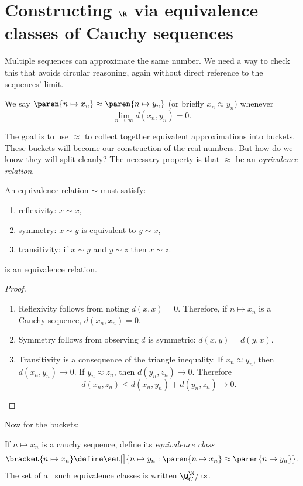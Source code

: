 \documentclass{scrartcl}
\newcommand{\dist}{d}
\begin{document}
\section{Constructing $\R$ via equivalence classes of Cauchy sequences}
Multiple sequences can approximate the same number. We need a way to check this that avoids circular reasoning, again without direct reference to the sequences' limit.
\begin{defn}[$\approx$]\label{cauchy-eq}
  We say $\paren{n\mapsto x_{n}}\approx\paren{n\mapsto  y_{n}}$ (or briefly $x_{n}\approx y_{n}$) whenever
  \[
    \lim_{{n\to\infty}} \dist(x_{n},y_{n}) = 0.
  \]
\end{defn}

The goal is to use $\approx$ to collect together equivalent approximations into buckets. These buckets will become our construction of the real numbers. But how do we know they will split cleanly? The necessary property is that $\approx$ be an \emph{equivalence relation}.
\begin{defn}
  An equivalence relation $\sim$ must satisfy:
  \begin{enumerate}
    \item reflexivity: $x\sim x$,
    \item symmetry: $x\sim y$ is equivalent to $y\sim x$,
    \item transitivity: if $x\sim y$ and $y \sim z$ then $x\sim z$.
  \end{enumerate}
\end{defn}
\begin{theorem}
   is an equivalence relation.
\end{theorem}
\begin{proof}
  \phantom{M}
  \begin{enumerate}
    \item Reflexivity follows from noting $\dist(x,x)=0$. Therefore, if $n \mapsto x_{n}$ is a Cauchy sequence, $\dist(x_{n},x_{n})=0$.

    \item Symmetry follows from observing $\dist$ is symmetric: $\dist(x,y)=\dist(y,x)$.
    \item Transitivity is a consequence of the triangle inequality.
          If $x_{n}\approx y_{n}$, then $\dist(x_{n},y_{n})\to 0$. If $y_{n}\approx z_{n}$, then $\dist(y_{n},z_{n})\to 0$. Therefore
          \[
          \dist(x_{n},z_{n}) \leq \dist(x_{n},y_{n}) + \dist(y_{n},z_{n}) \to 0.
          \]
  \end{enumerate}
\end{proof}
Now for the buckets:
\begin{defn}
  If $n\mapsto x_{n}$ is a cauchy sequence, define its \emph{equivalence class}
  \[
    \bracket{n\mapsto x_{n}} \define \set[\big]{n\mapsto y_{n}: \paren{n\mapsto x_{n}}\approx \paren{n\mapsto y_{n}}}.
  \]
  The set of all such equivalence classes is written $\Q^{\N}_{C}/\approx$.
\end{defn}
\end{document}
